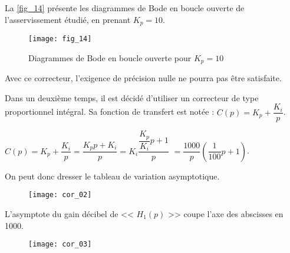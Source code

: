 \ifprof
\else

La \autoref{fig_14} présente les diagrammes de Bode en boucle ouverte de l’asservissement étudié, en prenant $K_p=10$.

\begin{figure}[H]
\centering
\texttt{[image: fig\_14]}
\caption{Diagrammes de Bode en boucle ouverte pour $K_p = 10$\label{fig_14}}
\end{figure}

\fi

\ifprof
\begin{corrige}
Avec ce correcteur, l'exigence de précision nulle ne pourra pas être satisfaite.
\end{corrige}
\else
\fi

\ifprof
\else

Dans un deuxième temps, il est décidé d’utiliser un correcteur de type proportionnel intégral. Sa fonction de transfert est notée : $C(p)=K_p+\dfrac{K_i}{p}$.
\fi

%
%

\ifprof
\begin{corrige}

$C(p)=K_p+\dfrac{K_i}{p}=\dfrac{K_p p + K_i}{p} = K_i \dfrac{\dfrac{K_p}{K_i} p +1 }{p}$
$=\dfrac{1000}{p}\left(\dfrac{1}{100}p+1\right)$. 

On peut donc dresser le tableau de variation asymptotique.

\begin{figure}[H]
\centering
\texttt{[image: cor\_02]}
\end{figure}

L'asymptote du gain décibel de << $H_1(p)$ >> coupe l'axe des abscisses en 1000.

\begin{figure}[H]
\centering
\texttt{[image: cor\_03]}
\end{figure}


\end{corrige}
\else
\fi


